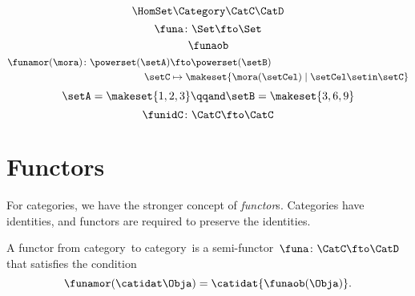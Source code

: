 {\begin{forslides}
\begin{equation}
            \HomSet\Category\CatC\CatD
        \end{equation}
        \begin{equation}
            \label{eq:pow_fun_1}
            \funa\colon \Set \fto \Set
        \end{equation}
        \begin{equation}
            \label{eq:pow_fun_2}
            \funaob
        \end{equation}
        \begin{equation}
            \label{eq:pow_fun_3}
            \begin{aligned}
                \funamor(\mora)\colon \powerset(\setA) & \fto \powerset(\setB) \\
                \setC                                  & \mapsto \makeset{ \mora(\setCel) \mid \setCel \setin \setC}
            \end{aligned}
        \end{equation}
        \begin{equation}
            \label{eq:pow_fun_4}
            \setA=\makeset{ 1,2,3} \qqand \setB=\makeset{3,6,9}
        \end{equation}
        \begin{equation}
            \label{eq:idfun}
            \funidC \colon \CatC \fto \CatC
        \end{equation}
    \end{forslides}
}

\section{Functors}

For categories, we have the stronger concept of \emph{functor}s.
Categories have identities, and functors are required to preserve the identities.

\begin{ctdefinition}
    \label{def:functor}
    A functor from category~\CatC to category~\CatD is a semi-functor~$\funa\colon \CatC \fto \CatD$
    that satisfies the condition
    \begin{equation}
        \label{eq:functor-condition}
        \funamor(\catidat\Obja)=\catidat{\funaob(\Obja)}.
    \end{equation}
\end{ctdefinition}


